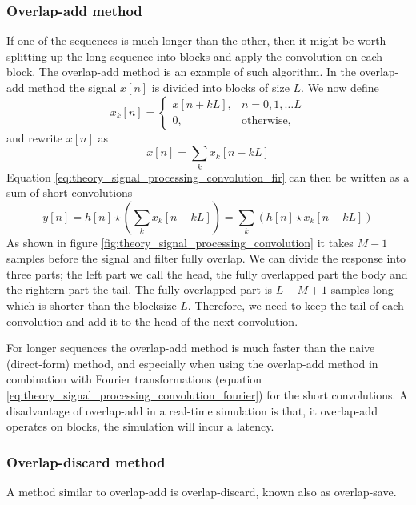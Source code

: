 \subsubsection{Overlap-add method}
If one of the sequences is much longer than the other, then it might be worth
splitting up the long sequence into blocks and apply the convolution on each
block. The overlap-add method is an example of such algorithm. In the
overlap-add method the signal $x[n]$ is divided into blocks of size $L$. We now
define
\begin{equation}
 x_k[n] =
 \begin{cases}
  x[n+kL], & n = 0,1,\dots L \\
  0, & \text{otherwise,}
 \end{cases}
\end{equation}
and rewrite $x[n]$ as
\begin{equation}
 x[n] = \sum_k x_k[n-kL]
\end{equation}
Equation \ref{eq:theory_signal_processing_convolution_fir} can then be written as a sum of short convolutions
\begin{equation}
y[n] = h[n] \star \left( \sum_k x_k[n-kL] \right) = \sum_k \left( h[n] \star x_k[n-kL] \right)
\end{equation}
As shown in figure \ref{fig:theory_signal_processing_convolution} it takes $M-1$
samples before the signal and filter fully overlap. We can divide the response
into three parts; the left part we call the head, the fully overlapped part the
body and the rightern part the tail. The fully overlapped part is $L-M+1$
samples long which is shorter than the blocksize $L$. Therefore, we need to keep
the tail of each convolution and add it to the head of the next convolution.

For longer sequences the overlap-add method is much faster than the naive
(direct-form) method, and especially when using the overlap-add method in
combination with Fourier transformations (equation
\ref{eq:theory_signal_processing_convolution_fourier}) for the short
convolutions. A disadvantage of overlap-add in a real-time simulation is that,
it overlap-add operates on blocks, the simulation will incur a latency.

\subsubsection{Overlap-discard method}
A method similar to overlap-add is overlap-discard, known also as overlap-save.

